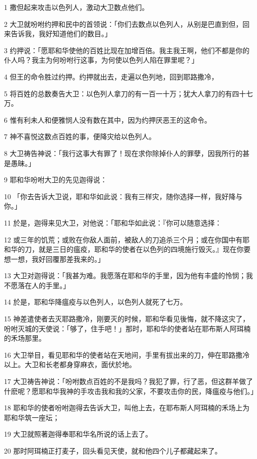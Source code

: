 \par 1 撒但起来攻击以色列人，激动大卫数点他们。
\par 2 大卫就吩咐约押和民中的首领说：「你们去数点以色列人，从别是巴直到但，回来告诉我，我好知道他们的数目。」
\par 3 约押说：「愿耶和华使他的百姓比现在加增百倍。我主我王啊，他们不都是你的仆人吗？我主为何吩咐行这事，为何使以色列人陷在罪里呢？」
\par 4 但王的命令胜过约押。约押就出去，走遍以色列地，回到耶路撒冷，
\par 5 将百姓的总数奏告大卫：以色列人拿刀的有一百一十万；犹大人拿刀的有四十七万。
\par 6 惟有利未人和便雅悯人没有数在其中，因为约押厌恶王的这命令。
\par 7 神不喜悦这数点百姓的事，便降灾给以色列人。
\par 8 大卫祷告神说：「我行这事大有罪了！现在求你除掉仆人的罪孽，因我所行的甚是愚昧。」
\par 9 耶和华吩咐大卫的先见迦得说：
\par 10 「你去告诉大卫说，耶和华如此说：我有三样灾，随你选择一样，我好降与你。」
\par 11 於是，迦得来见大卫，对他说：「耶和华如此说：『你可以随意选择：
\par 12 或三年的饥荒；或败在你敌人面前，被敌人的刀追杀三个月；或在你国中有耶和华的刀，就是三日的瘟疫，耶和华的使者在以色列的四境施行毁灭。』现在你要想一想，我好回覆那差我来的。」
\par 13 大卫对迦得说：「我甚为难。我愿落在耶和华的手里，因为他有丰盛的怜悯；我不愿落在人的手里。」
\par 14 於是，耶和华降瘟疫与以色列人，以色列人就死了七万。
\par 15 神差遣使者去灭耶路撒冷，刚要灭的时候，耶和华看见後悔，就不降这灾了，吩咐灭城的天使说：「够了，住手吧！」那时，耶和华的使者站在耶布斯人阿珥楠的禾场那里。
\par 16 大卫举目，看见耶和华的使者站在天地间，手里有拔出来的刀，伸在耶路撒冷以上。大卫和长老都身穿麻衣，面伏於地。
\par 17 大卫祷告神说：「吩咐数点百姓的不是我吗？我犯了罪，行了恶，但这群羊做了什麽呢？愿耶和华我神的手攻击我和我的父家，不要攻击你的民，降瘟疫与他们。」
\par 18 耶和华的使者吩咐迦得去告诉大卫，叫他上去，在耶布斯人阿珥楠的禾场上为耶和华筑一座坛；
\par 19 大卫就照著迦得奉耶和华名所说的话上去了。
\par 20 那时阿珥楠正打麦子，回头看见天使，就和他四个儿子都藏起来了。
